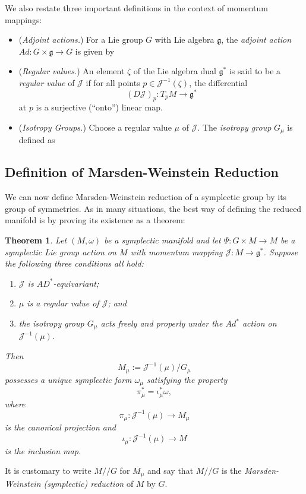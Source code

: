 \documentclass{tufte-handout}
\newtheorem{thrm}{Theorem}
\begin{document}
We also restate three important definitions in the context of momentum mappings:
\begin{itemize}
\item (\emph{Adjoint actions.}) For a Lie group $G$ with Lie algebra $\mathfrak{g}$, the \emph{adjoint action} $Ad: G \times \mathfrak{g} \to G$ is given by %

\item (\emph{Regular values.}) An element $\zeta$ of the Lie algebra dual $\mathfrak{g}^*$ is said to be a \emph{regular value} of $\mathcal{J}$ if for all points $p \in \mathcal{J}^{-1}(\zeta)$, the differential
$$
(D\mathcal{J})_p : T_p M \to \mathfrak{g}^*
$$
at $p$ is a surjective (``onto'') linear map.

\item (\emph{Isotropy Groups.}) Choose a regular value $\mu$ of $\mathcal{J}$. The \emph{isotropy group} $G_\mu$ is defined as %
\end{itemize}

\subsection{Definition of Marsden-Weinstein Reduction}
We can now define Marsden-Weinstein reduction of a symplectic group by its group of symmetries. As in many situations, the best way of defining the reduced manifold is by proving its existence as a theorem:
\begin{fullwidth}
\begin{thrm}
Let $(M,\omega)$ be a symplectic manifold and let $\Psi: G \times M \to M$ be a symplectic Lie group action on $M$ with momentum mapping $\mathcal{J}: M \to \mathfrak{g}^*$. Suppose the following three conditions all hold:
\begin{enumerate}
\item $\mathcal{J}$ is $AD^*$-equivariant;
\item $\mu$ is a regular value of $\mathcal{J}$; and
\item the isotropy group $G_\mu$ acts freely and properly under the $Ad^*$ action on $\mathcal{J}^{-1}(\mu)$.
\end{enumerate}
Then
$$
M_\mu := \mathcal{J}^{-1}(\mu) / G_\mu
$$
possesses a \emph{unique} symplectic form $\omega_\mu$ satisfying the property
$$
\pi^*_\mu = \iota^*_\mu \omega,
$$
where
$$
\pi_\mu : \mathcal{J}^{-1}(\mu) \to M_\mu
$$
is the canonical projection and
$$
\iota_\mu : \mathcal{J}^{-1}(\mu) \to M
$$
is the inclusion map.
\end{thrm}
\end{fullwidth}
It is customary to write $M // G$ for $M_\mu$ and say that $M // G$ is the \emph{Marsden-Weinstein (symplectic) reduction} of $M$ by $G$.
\end{document}
